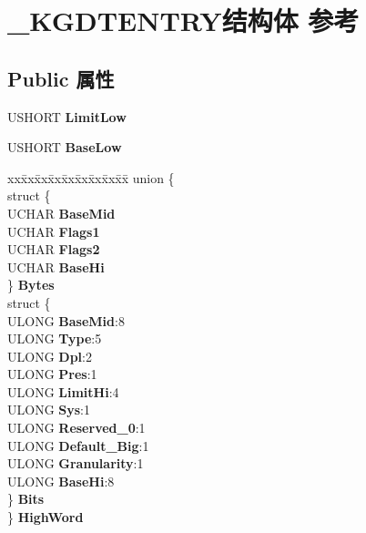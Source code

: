 \hypertarget{struct___k_g_d_t_e_n_t_r_y}{}\section{\+\_\+\+K\+G\+D\+T\+E\+N\+T\+R\+Y结构体 参考}
\label{struct___k_g_d_t_e_n_t_r_y}
\subsection*{Public 属性}
\begin{DoxyCompactItemize}
\item 
\mbox{\label{struct___k_g_d_t_e_n_t_r_y_a752dbb3dc5ba1fc09f80b64190f2c89b}} 
U\+S\+H\+O\+RT {\bfseries Limit\+Low}
\item 
\mbox{\label{struct___k_g_d_t_e_n_t_r_y_a6c1ff0c43643ba126166908d75c256af}} 
U\+S\+H\+O\+RT {\bfseries Base\+Low}
\item 
\mbox{\label{struct___k_g_d_t_e_n_t_r_y_aaa36fb8f215d742d234dd72516a5549b}} 
\begin{tabbing}
xx\=xx\=xx\=xx\=xx\=xx\=xx\=xx\=xx\=\kill
union \{\\
\>struct \{\\
\>\>UCHAR {\bfseries BaseMid}\\
\>\>UCHAR {\bfseries Flags1}\\
\>\>UCHAR {\bfseries Flags2}\\
\>\>UCHAR {\bfseries BaseHi}\\
\>\} {\bfseries Bytes}\\
\>struct \{\\
\>\>ULONG {\bfseries BaseMid}:8\\
\>\>ULONG {\bfseries Type}:5\\
\>\>ULONG {\bfseries Dpl}:2\\
\>\>ULONG {\bfseries Pres}:1\\
\>\>ULONG {\bfseries LimitHi}:4\\
\>\>ULONG {\bfseries Sys}:1\\
\>\>ULONG {\bfseries Reserved\_0}:1\\
\>\>ULONG {\bfseries Default\_Big}:1\\
\>\>ULONG {\bfseries Granularity}:1\\
\>\>ULONG {\bfseries BaseHi}:8\\
\>\} {\bfseries Bits}\\
\} {\bfseries HighWord}\\


\end{tabbing}
\end{DoxyCompactItemize}
